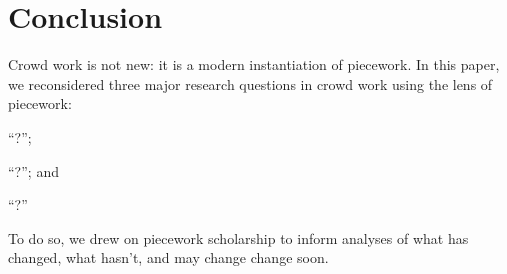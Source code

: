\documentclass[trackingWork]{subfiles}
\begin{document}
\section{Conclusion}
Crowd work is not new: it is a modern instantiation of piecework.
In this paper, we reconsidered three major research questions in crowd work using the lens of piecework: \begin{inlinelist}
  \item ``?'';
  \item ``?'';
        and
  \item ``?''
\end{inlinelist}
To do so, we drew on piecework scholarship to inform analyses of what has changed, what hasn't, and may change change soon. 
\end{document}
